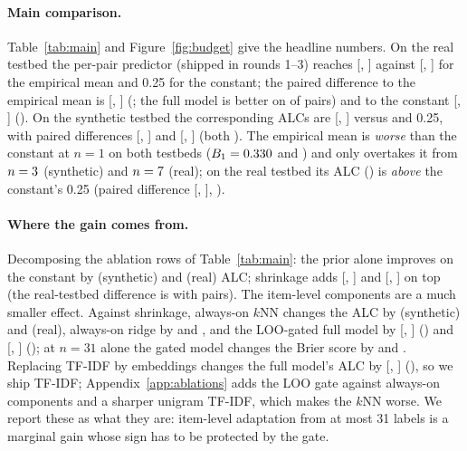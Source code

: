 \documentclass{article}
\begin{document}
\paragraph{Main comparison.}
Table~\ref{tab:main} and Figure~\ref{fig:budget} give the headline numbers. On the real testbed the per-pair predictor (shipped in rounds 1--3) reaches \RFullAlc{} [\RFullAlcLo, \RFullAlcHi] against \REmpAlc{} [\REmpAlcLo, \REmpAlcHi] for the empirical mean and 0.25 for the constant; the paired difference to the empirical mean is \RPairFullEmpMean{} [\RPairFullEmpLo, \RPairFullEmpHi] (\RPairFullEmpSig; the full model is better on \RPairFullEmpFrac{} of pairs) and to the constant \RPairFullConstMean{} [\RPairFullConstLo, \RPairFullConstHi] (\RPairFullConstSig). On the synthetic testbed the corresponding ALCs are \SFullAlc{} [\SFullAlcLo, \SFullAlcHi] versus \SEmpAlc{} and 0.25, with paired differences \SPairFullEmpMean{} [\SPairFullEmpLo, \SPairFullEmpHi] and \SPairFullConstMean{} [\SPairFullConstLo, \SPairFullConstHi] (both \SPairFullConstSig). The empirical mean is \emph{worse} than the constant at $n=1$ on both testbeds ($B_1=0.330$ and \REmpBOne) and only overtakes it from $n=3$ (synthetic) and $n=7$ (real); on the real testbed its ALC (\REmpAlc) is \emph{above} the constant's 0.25 (paired difference \RPairEmpConstMean{} [\RPairEmpConstLo, \RPairEmpConstHi], \RPairEmpConstSig).

\paragraph{Where the gain comes from.}
Decomposing the ablation rows of Table~\ref{tab:main}: the prior alone improves on the constant by \SPairPriorConstMean{} (synthetic) and \RPairPriorConstMean{} (real) ALC; shrinkage adds \SPairShrinkPriorMean{} [\SPairShrinkPriorLo, \SPairShrinkPriorHi] and \RPairShrinkPriorMean{} [\RPairShrinkPriorLo, \RPairShrinkPriorHi] on top (the real-testbed difference is \RPairShrinkPriorSig{} with \RNPairs{} pairs). The item-level components are a much smaller effect. Against shrinkage, always-on $k$NN changes the ALC by \SPairKnnShrinkMean{} (synthetic) and \RPairKnnShrinkMean{} (real), always-on ridge by \SPairRidgeShrinkMean{} and \RPairRidgeShrinkMean, and the LOO-gated full model by \SPairFullShrinkMean{} [\SPairFullShrinkLo, \SPairFullShrinkHi] (\SPairFullShrinkSig) and \RPairFullShrinkMean{} [\RPairFullShrinkLo, \RPairFullShrinkHi] (\RPairFullShrinkSig); at $n=31$ alone the gated model changes the Brier score by \SPairFullShrinkBThirtyOneMean{} and \RPairFullShrinkBThirtyOneMean. Replacing TF-IDF by \texttt{\REmbModel} embeddings changes the full model's ALC by \REmbPairFullMean{} [\REmbPairFullLo, \REmbPairFullHi] (\REmbPairFullSig), so we ship TF-IDF; Appendix~\ref{app:ablations} adds the LOO gate against always-on components and a sharper unigram TF-IDF, which makes the $k$NN worse. We report these as what they are: item-level adaptation from at most 31 labels is a marginal gain whose sign has to be protected by the gate.
\end{document}
